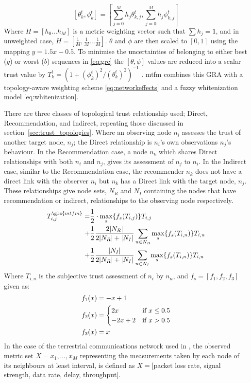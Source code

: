%
\begin{equation}
  \label{eq:metric_weighting}
  [\theta_k^t, \phi_k^t] = \left[\sum_{j=0}^M h_j \theta_{k,j}^t,\sum_{j=0}^M h_j \phi_{k,j}^t \right]
\end{equation}
%
Where $H=[h_0\dots h_M]$ is a metric weighting vector such that $\sum h_j = 1$, and in unweighted case, $H=[\frac{1}{M},\frac{1}{M}\dots\frac{1}{M}]$.
$\theta$ and $\phi$ are then scaled to $[0,1]$ using the mapping $y = 1.5 x - 0.5$.
To minimise the uncertainties of belonging to either best ($g$) or worst ($b$) sequences in \eqref{eq:grc} the $[\theta,\phi]$ values are reduced into a scalar trust value by $T_k^t = ({1+{(\phi_k^t)^2}/{(\theta_k^t)^2}})^{-1}$ \cite{Hong2010}.
\gls{mtfm} combines this GRA with a topology-aware weighting scheme \eqref{eq:networkeffects} and a fuzzy whitenization model \eqref{eq:whitenization}.

There are three classes of topological trust relationship used; Direct, Recommendation, and Indirect, repeating those discussed in section~\ref{sec:trust_topologies}.
Where an observing node $n_i$ assesses the trust of another target node, $n_j$; the Direct relationship is $n_i$'s own observations $n_j$'s behaviour.
In the Recommendation case, a node $n_k$ which shares Direct relationships with both $n_i$ and $n_j$, gives its assessment of $n_j$ to $n_i$.
In the Indirect case, similar to the Recommendation case, the recommender $n_k$ does not have a direct link with the observer $n_i$ but $n_k$ has a Direct link with the target node, $n_j$.
These relationships give node sets, $N_R$ and $N_I$ containing the nodes that have recommendation or indirect, relationships to the observing node respectively.
%
\begin{align}
  \label{eq:networkeffects}
  T_{i,j}^{\gls{mtfm}}=&\frac{1}{2} \cdot \max_s\{f_s(T_{i,j})\} T_{i,j}\\ \notag
  +&\frac{1}{2} \frac{2|N_R| }{2|N_R| + |N_I|}\sum_{n \in N_R} \max_s\{f_s(T_{i,n})\} T_{i,n}\\ \notag
  +&\frac{1}{2} \frac{|N_I| }{2|N_R| + |N_I|}\sum_{n \in N_I} \max_s\{f_s(T_{i,n})\} T_{i,n} 
\end{align}
Where $T_{i,n}$ is the subjective trust assessment of $n_i$ by $n_n$, and $f_s = [ f_1,f_2, f_3]$ given as:
\begin{align}
  \label{eq:whitenization}
  f_1(x)&= -x+1\notag\\
  f_2(x)&= 
  \begin{cases}
    2x & \text{if }x\leq 0.5\\
    -2x+2 & \text{if }x>0.5
  \end{cases}\\
  f_3(x)&= x\notag
\end{align}
%
In the case of the terrestrial communications network used in \cite{Guo11}, the observed metric set $X = {x_1,\dots,x_M}$ representing the measurements taken by each node of its neighbours at least interval, is defined as $X=[$packet loss rate, signal strength, data rate, delay, throughput$]$.


